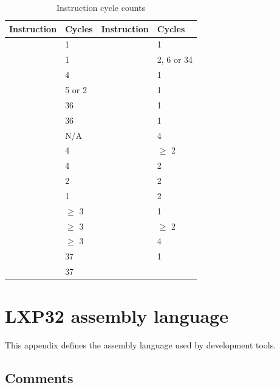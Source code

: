\documentclass[a4paper,12pt,twoside,extrafontsizes]{memoir}
\begin{document}
\begin{table}[htbp]
	\centering
	\caption{Instruction cycle counts}
	\label{tab:cycles}
	\begin{tabularx}{0.8\textwidth}{LLLL}
		\toprule
		Instruction & Cycles & Instruction & Cycles \\
		\midrule
		 & 1 &  & 1 \\
		 & 1 &  & 2, 6 or 34\footnotemark[3] \\
		 & 4 &  & 1 \\
		 & 5 or 2\footnotemark[1] &  & 1 \\
		 & 36 &  & 1 \\
		 & 36 &  & 1 \\
		 & N/A &  & 4 \\
		 & 4 &  & $\ge$ 2\footnotemark[2] \\
		 & 4 &  & 2 \\
		 & 2 &  & 2 \\
		 & 1 &  & 2 \\
		 & $\ge$ 3\footnotemark[2] &  & 1 \\
		 & $\ge$ 3\footnotemark[2] &  & $\ge$ 2\footnotemark[2] \\
		 & $\ge$ 3\footnotemark[2] &  & 4 \\
		 & 37 &  & 1 \\
		 & 37 &  \\
		\bottomrule
	\end{tabularx}
\end{table}


\chapter{LXP32 assembly language}
\label{app:assemblylanguage}

This appendix defines the assembly language used by \lxp{} development tools.

\section{Comments}
\end{document}

